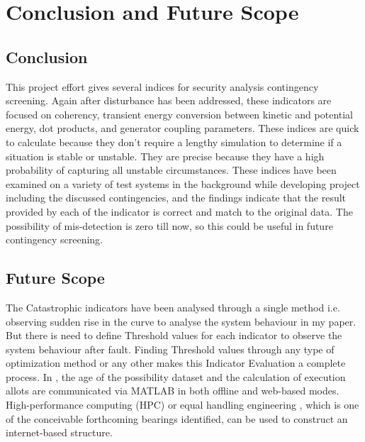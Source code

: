 \chapter{Conclusion and Future Scope}
\section{Conclusion}
This project effort gives several indices for security analysis contingency screening. Again after disturbance has been addressed, these indicators are focused on coherency, transient energy conversion between kinetic and potential energy, dot products, and generator coupling parameters. These indices are quick to calculate because they don't require a lengthy simulation to determine if a situation is stable or unstable. They are precise because they have a high probability of capturing all unstable circumstances. These indices have been examined on a variety of test systems in the background while developing project including the discussed contingencies, and the findings indicate that the result provided by each of the indicator is correct and match to the original data. The possibility of mis-detection is zero till now, so this could be useful in future contingency screening.

 \pagebreak

\section{Future Scope}


The Catastrophic indicators have been analysed through a single method i.e. observing sudden rise in the curve to analyse the system behaviour in my paper. But there is need to define Threshold values for each indicator to observe the system behaviour after fault. Finding Threshold values through any type of optimization method or any other makes this Indicator Evaluation a complete process. In \cite{8}, the age of the possibility dataset and the calculation of execution allots are communicated via MATLAB in both offline and web-based modes. High-performance computing (HPC) \cite{FR1} or equal handling engineering \cite{FR2}, which is one of the conceivable forthcoming bearings identified, can be used to construct an internet-based structure.

